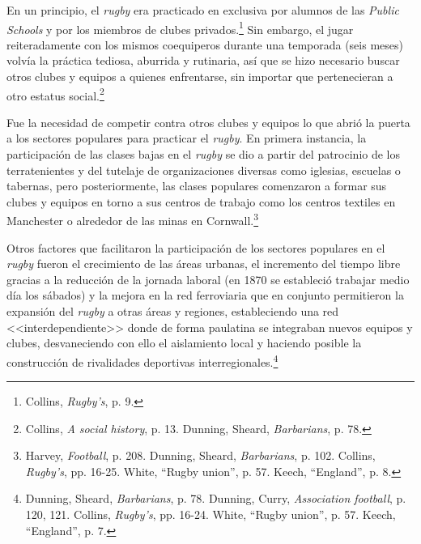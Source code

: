 \documentclass[11pt,a5paper,twoside]{book} %
\begin{document}
En un principio, el \emph{rugby} era practicado en exclusiva por alumnos de las \emph{Public Schools} y por los miembros de clubes privados.\footnote{Collins, \emph{Rugby's}, p. 9.} Sin embargo, el jugar reiteradamente con los mismos coequiperos durante una temporada (seis meses) volvía la práctica tediosa, aburrida y rutinaria, así que se hizo necesario buscar otros clubes y equipos a quienes enfrentarse, sin importar que pertenecieran a otro estatus social.\footnote{Collins, \emph{A social history}, p. 13. Dunning, Sheard, \emph{Barbarians}, p. 78.}

Fue la necesidad de competir contra otros clubes y equipos lo que abrió la puerta a los sectores populares para practicar el \emph{rugby}. En primera instancia, la participación de las clases bajas en el \emph{rugby} se dio a partir del patrocinio de los terratenientes y del tutelaje de organizaciones diversas como iglesias, escuelas o tabernas, pero posteriormente, las clases populares comenzaron a formar sus clubes y equipos en torno a sus centros de trabajo como los centros textiles en Manchester o alrededor de las minas en Cornwall.\footnote{Harvey, \emph{Football}, p. 208. Dunning, Sheard, \emph{Barbarians}, p. 102. Collins, \emph{Rugby's}, pp. 16-25. White, ``Rugby union'', p. 57. Keech, ``England'', p. 8.}

Otros factores que facilitaron la participación de los sectores populares en el \emph{rugby} fueron el crecimiento de las áreas urbanas, el incremento del tiempo libre gracias a la reducción de la jornada laboral (en 1870 se estableció trabajar medio día los sábados) y la mejora en la red ferroviaria que en conjunto permitieron la expansión del \emph{rugby} a otras áreas y regiones, estableciendo una red <<interdependiente>> donde de forma paulatina se integraban nuevos equipos y clubes, desvaneciendo con ello el aislamiento local y haciendo posible la construcción de rivalidades deportivas interregionales.\footnote{Dunning, Sheard, \emph{Barbarians}, p. 78. Dunning, Curry, \emph{Association football}, p. 120, 121. Collins, \emph{Rugby's}, pp. 16-24. White, ``Rugby union'', p. 57. Keech, ``England'', p. 7.}
\end{document}
